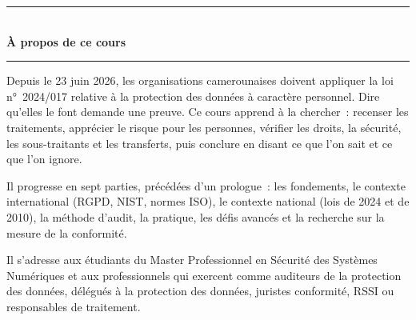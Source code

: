 \documentclass[12pt, twoside, openright, a4paper]{book}
\begin{document}
    \nocite{*}
    \printbibliography[heading=bibintoc, title={Références bibliographiques}]

    \printindex

\clearpage
\thispagestyle{empty}
\pagecolor{CouleurPrimaire}


\vspace*{1.8cm}

\begin{center}
    {\color{CouleurAccent}\rule{0.6\linewidth}{1pt}}\\[1.5ex]
    {\color{white}\Large\bfseries À propos de ce cours}\\[1.5ex]
    {\color{CouleurAccent}\rule{0.6\linewidth}{1pt}}
\end{center}

\vspace{1cm}

\begin{center}
\begin{minipage}{0.75\textwidth}
\color{white!85!gray}
Depuis le 23 juin 2026, les organisations camerounaises doivent appliquer la
loi n°~2024/017 relative à la protection des données à caractère personnel.
Dire qu'elles le font demande une preuve. Ce cours apprend à la chercher~:
recenser les traitements, apprécier le risque pour les personnes, vérifier
les droits, la sécurité, les sous-traitants et les transferts, puis conclure
en disant ce que l'on sait et ce que l'on ignore.

\medskip

Il progresse en sept parties, précédées d'un prologue~: les fondements, le
contexte international (RGPD, NIST, normes ISO), le contexte national (lois
de 2024 et de 2010), la méthode d'audit, la pratique, les défis avancés et
la recherche sur la mesure de la conformité.

\medskip

Il s'adresse aux étudiants du Master Professionnel en Sécurité des Systèmes
Numériques et aux professionnels qui exercent comme auditeurs de la
protection des données, délégués à la protection des données, juristes
conformité, RSSI ou responsables de traitement.
\end{minipage}
\end{center}
\end{document}
